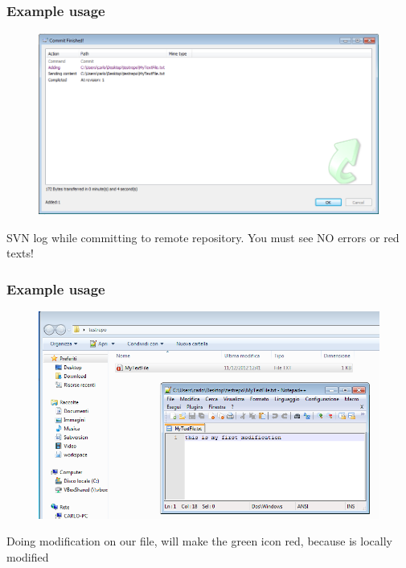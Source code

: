 \documentclass[10pt]{beamer}
\begin{document}
\begin{frame}[fragile]
\frametitle{Example usage}
\begin{figure}[h]
 \centering
 \includegraphics[width=1.0\textwidth]{images/image10.png}
\end{figure}
SVN log while committing to remote repository. You must see NO errors or red texts!
\end{frame}


\begin{frame}[fragile]
\frametitle{Example usage}
\begin{figure}[h]
 \centering
 \includegraphics[width=1.0\textwidth]{images/image11.png}
\end{figure}
Doing modification on our file, will make the green icon red, because is locally modified
\end{frame}
\end{document}
